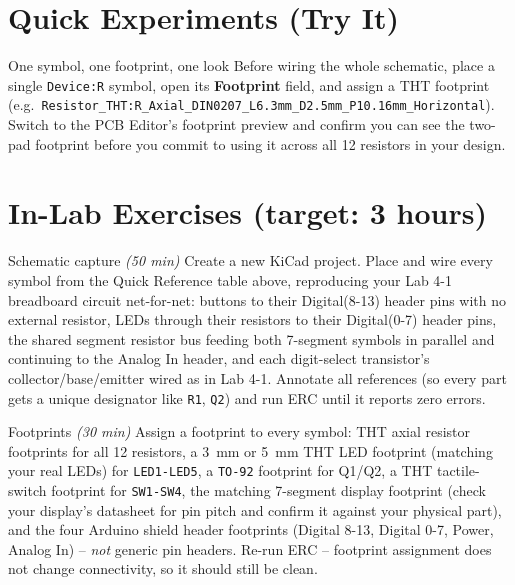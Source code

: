 \documentclass[11pt]{article}
\begin{document}
\section*{Quick Experiments (Try It)}

\begin{tryit}{One symbol, one footprint, one look}
Before wiring the whole schematic, place a single \texttt{Device:R} symbol, open its
\textbf{Footprint} field, and assign a THT footprint (e.g.\
\texttt{Resistor\_THT:R\_Axial\_DIN0207\_L6.3mm\_D2.5mm\_P10.16mm\_Horizontal}). Switch
to the PCB Editor's footprint preview and confirm you can see the two-pad footprint
before you commit to using it across all 12 resistors in your design.
\end{tryit}

\section*{In-Lab Exercises (target: 3 hours)}

\begin{labexercise}{Schematic capture \hfill {\small \itshape (50 min)}}
Create a new KiCad project. Place and wire every symbol from the Quick Reference
table above, reproducing your Lab 4-1 breadboard circuit net-for-net: buttons to
their Digital(8-13) header pins with no external resistor, LEDs through their
resistors to their Digital(0-7) header pins, the shared segment resistor bus
feeding both 7-segment symbols in parallel and continuing to the Analog In header,
and each digit-select transistor's collector/base/emitter wired as in Lab 4-1.
Annotate all references (so every part gets a unique designator like \texttt{R1},
\texttt{Q2}) and run ERC until it reports zero errors.
\end{labexercise}

\begin{labexercise}{Footprints \hfill {\small \itshape (30 min)}}
Assign a footprint to every symbol: THT axial resistor footprints for all 12
resistors, a 3~mm or 5~mm THT LED footprint (matching your real LEDs) for
\texttt{LED1-LED5}, a \texttt{TO-92} footprint for Q1/Q2, a THT tactile-switch
footprint for \texttt{SW1-SW4}, the matching 7-segment display footprint (check your
display's datasheet for pin pitch and confirm it against your physical part), and
the four Arduino shield header footprints (Digital 8-13, Digital 0-7, Power, Analog
In) -- \emph{not} generic pin headers. Re-run ERC -- footprint assignment does not
change connectivity, so it should still be clean.
\end{labexercise}
\end{document}
